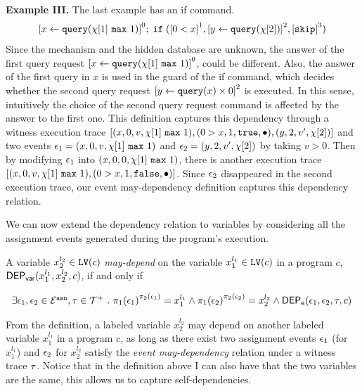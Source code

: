 \textbf{Example III.} The last example has an if command.
\[
 \clabel{\assign{x}{\query(\chi[1] \emax 1 )}}^0;
 \eif (\clabel{0 < x}^1, \clabel{\assign{y}{\query(\chi[2])}}^2, \clabel{\eskip}^3)
\]
Since the mechanism and the hidden database are unknown, the answer of the first query request $\clabel{\assign{x}{\query(\chi[1] \emax 1 )}}^0$, could be different.
Also, the answer of the first query in $x$ is used in the guard of the if command,
which
decides whether the second query request $\clabel{\assign{y}{\query(x) \times 0}}^2$ is executed.
In this sense, intuitively the choice of the second query 
request command is affected by
the answer to the first one.
This definition captures this dependency through a witness execution trace
$[(x, 0, v, \chi[1] ~\mathtt{max}~ 1), (0 > x, 1, \mathtt{true}, \bullet), (y, 2, v', \chi[2])]$ and
two events 
$\mathtt{\epsilon}_1 = (x, 0, v, \chi[1] ~\mathtt{max}~ 1) $ and $\mathtt{\epsilon}_2 = (y, 2, v', \chi[2])$ by taking $v> 0$.
Then by modifying $\mathtt{\epsilon}_1 $ into $(x, 0, 0, \chi[1] ~\mathtt{max}~ 1)$,
there is another execution trace $[(x, 0, v, \chi[1] ~\mathtt{max}~ 1), (0 > x, 1, \mathtt{false}, \bullet)]$.
Since $\mathtt{\epsilon}_2 $ disappeared in the second execution trace,
our event may-dependency definition captures this dependency relation.

 
We can now extend the dependency relation to variables by considering all the assignment events generated during the program's execution. 

\begin{defn}
 \label{def:var_dep}
A variable ${x}_2^{l_2} \in \mathtt{LV}(c)$ \emph{may-depend} on the 
 variable ${x}_1^{l_1} \in \mathtt{LV}(c)$ in a program ${c}$,
 $\mathsf{DEP_{var}}({x}_1^{l_1}, {x}_2^{l_2}, {c})$, if and only if
\begin{center}
$
{
\begin{array}{l}
\exists \event_1, \event_2 \in \eventset^{\asn}, \trace \in \ftdom \sthat
\pi_{1}{(\event_1)}^{\pi_{2}{(\event_1)}} = {x}_1^{l_1}
\land
\pi_{1}{(\event_2)}^{\pi_{2}{(\event_2)}} = {x}_2^{l_2}%
\land 
\eventdep(\event_1, \event_2, \trace, c) 
 \end{array}
}%
$
\end{center}
 \end{defn}
From the definition, a labeled variable $x_2^{l_2}$ may depend on another labeled variable $x_1^{l_1}$ in a program $c$, 
as long as there exist two assignment events $\mathtt{\epsilon}_1$ (for $x_1^{l_1}$) and $\mathtt{\epsilon}_2$ for $x_2^{l_2}$
satisfy the \emph{event may-dependency} relation under a witness trace $\mathtt{\tau}$. 
Notice that in the definition above I can also have that the two variables are the same,
this allows us to capture self-dependencies.

